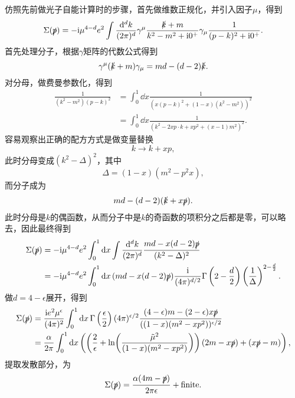 \documentclass[hyperref, UTF8, a4paper]{ctexart}
\newcommand*{\ii}{\mathrm{i}}
\begin{document}
仿照先前做光子自能计算时的步骤，首先做维数正规化，并引入因子$\mu$，得到
\begin{equation}
    \Sigma(\slashed{p}) = - \ii \mu^{4-d}  e^2 \int \frac{\dd[d]{k}}{(2\pi)^d} \gamma^\mu \frac{\slashed{k} + m}{k^2 - m^2 + \ii 0^+} \gamma_\mu \frac{1}{(p-k)^2 + \ii 0^+}.
\end{equation}
首先处理分子，根据$\gamma$矩阵的代数公式得到
\[
    \gamma^\mu (\slashed{k} + m) \gamma_\mu = md - (d-2) \slashed{k}.
\]
对分母，做费曼参数化，得到
\[
    \begin{aligned}
        \frac{1}{(k^2 - m^2)(p - k)^2} &= \int_0^1 \dd{x} \frac{1}{(x (p-k)^2 + (1-x) (k^2 - m^2))^2} \\
        &= \int_0^1 \dd{x} \frac{1}{(k^2 - 2 x p \cdot k + x p^2 + (x-1) m^2)^2}.
    \end{aligned}
\]
容易观察出正确的配方方式是做变量替换
\[
    k \longrightarrow k + xp,
\]
此时分母变成$(k^2 - \Delta)^2$，其中
\[
    \Delta = (1 - x)(m^2 - p^2 x),
\]
而分子成为
\[
    md - (d-2)(\slashed{k} + x \slashed{p}).
\]
此时分母是$k$的偶函数，从而分子中是$k$的奇函数的项积分之后都是零，可以略去，因此最终得到
\begin{equation}
    \begin{aligned}
        \Sigma(\slashed{p}) &= - \ii \mu^{4-d} e^2 \int_0^1 \dd{x} \int \frac{\dd[d]{k}}{(2\pi)^d} \frac{md - x (d-2) \slashed{p}}{(k^2 - \Delta)^2} \\
        &= - \ii \mu^{4-d} e^2 \int_0^1 \dd{x} (md - x (d-2) \slashed{p}) \frac{\ii}{(4\pi)^{d/2}} \Gamma\left(2 - \frac{d}{2} \right) \left(\frac{1}{\Delta}\right)^{2-\frac{d}{2}}. 
    \end{aligned}
\end{equation}
做$d = 4 - \epsilon$展开，得到
\begin{equation}
    \begin{aligned}
        \Sigma(\slashed{p}) &= \frac{\ii e^2 \mu^\epsilon}{(4\pi)^2} \int_0^1 \dd{x} \Gamma\left(\frac{\epsilon}{2}\right) (4\pi)^{\epsilon/2} \frac{(4-\epsilon) m - (2-\epsilon) x \slashed{p}}{((1-x) (m^2 - x p^2))^{\epsilon/2}} \\
        &= \frac{\alpha}{2\pi} \int_0^1 \dd{x} \left( \left( \frac{2}{\epsilon} + \ln(\frac{\tilde{\mu}^2}{(1-x) (m^2 - xp^2)}) \right) (2 m - x \slashed{p}) + (x \slashed{p} - m) \right),
    \end{aligned}
\end{equation}
提取发散部分，为
\begin{equation}
    \Sigma(\slashed{p}) = \frac{\alpha (4m - \slashed{p})}{2 \pi \epsilon} + \text{finite}.
    \label{eq:electron-one-loop-divergence}
\end{equation}
\end{document}
